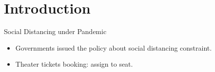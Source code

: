 
\section{Introduction}
\frame{\sectionpage}

\begin{frame}{Social Distancing under Pandemic}
  \begin{itemize}
    \item Governments issued the policy about social distancing constraint.
    \vspace*{2cm}
    \item Theater tickets booking: assign to seat.
  \end{itemize}
  \end{frame}
